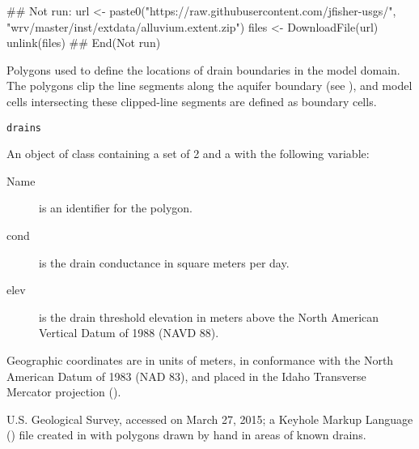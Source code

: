\documentclass[letterpaper]{book}
\begin{document}
%
\begin{Examples}
\begin{ExampleCode}
## Not run: 
url <- paste0("https://raw.githubusercontent.com/jfisher-usgs/",
              "wrv/master/inst/extdata/alluvium.extent.zip")
files <- DownloadFile(url)
unlink(files)
## End(Not run)
\end{ExampleCode}
\end{Examples}
%
\begin{Description}\relax
Polygons used to define the locations of drain boundaries in the model domain.
The polygons clip the line segments along the aquifer boundary (see ), and model cells intersecting these clipped-line segments are defined as boundary cells.
\end{Description}
%
\begin{Usage}
\begin{verbatim}
drains
\end{verbatim}
\end{Usage}
%
\begin{Format}
An object of  class containing a set of 2  and a  with the following variable:
\begin{description}

\item[Name] is an identifier for the polygon.
\item[cond] is the drain conductance in square meters per day.
\item[elev] is the drain threshold elevation in meters above the North American Vertical Datum of 1988 (NAVD 88).

\end{description}

Geographic coordinates are in units of meters, in conformance with the North American Datum of 1983 (NAD 83), and placed in the
Idaho Transverse Mercator projection ().
\end{Format}
%
\begin{Source}\relax
U.S. Geological Survey, accessed on March 27, 2015;
a Keyhole Markup Language () file created in  with polygons drawn by hand in areas of known drains.
\end{Source}
\end{document}
